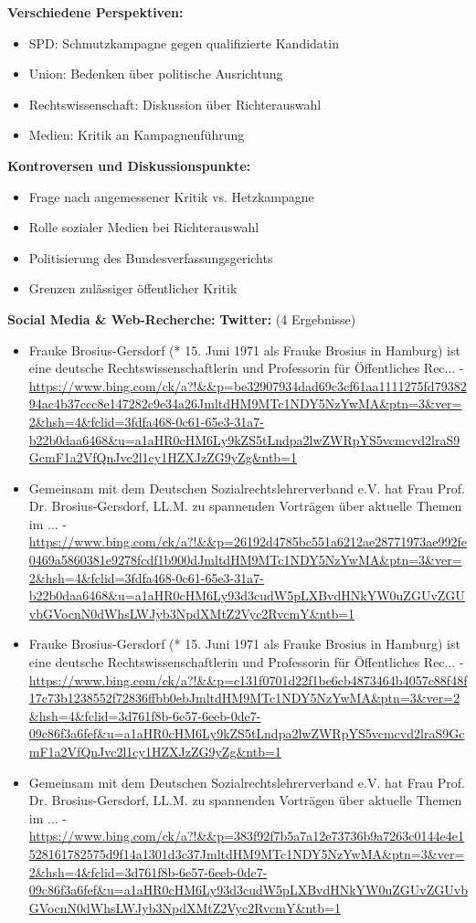 \documentclass[12pt,a4paper]{article}
\begin{document}
\textbf{Verschiedene Perspektiven:}
\begin{itemize}
\item SPD: Schmutzkampagne gegen qualifizierte Kandidatin
\item Union: Bedenken über politische Ausrichtung
\item Rechtswissenschaft: Diskussion über Richterauswahl
\item Medien: Kritik an Kampagnenführung
\end{itemize}

\textbf{Kontroversen und Diskussionspunkte:}
\begin{itemize}
\item Frage nach angemessener Kritik vs. Hetzkampagne
\item Rolle sozialer Medien bei Richterauswahl
\item Politisierung des Bundesverfassungsgerichts
\item Grenzen zulässiger öffentlicher Kritik
\end{itemize}

\textbf{Social Media \& Web-Recherche:}
\textbf{Twitter:} (4 Ergebnisse)
\begin{itemize}
\item Frauke Brosius-Gersdorf (* 15. Juni 1971 als Frauke Brosius in Hamburg) ist eine deutsche Rechtswissenschaftlerin und Professorin für Öffentliches Rec... - \url{https://www.bing.com/ck/a?!&&p=be32907934dad69c3cf61aa1111275fd7938294ac4b37ccc8e147282c9e34a26JmltdHM9MTc1NDY5NzYwMA&ptn=3&ver=2&hsh=4&fclid=3fdfa468-0c61-65e3-31a7-b22b0daa6468&u=a1aHR0cHM6Ly9kZS5tLndpa2lwZWRpYS5vcmcvd2lraS9GcmF1a2VfQnJvc2l1cy1HZXJzZG9yZg&ntb=1}
\item Gemeinsam mit dem Deutschen Sozialrechtslehrerverband e.V. hat Frau Prof. Dr. Brosius-Gersdorf, LL.M. zu spannenden Vorträgen über aktuelle Themen im ... - \url{https://www.bing.com/ck/a?!&&p=26192d4785bc551a6212ae28771973ae992fe0469a5860381e9278fcdf1b900dJmltdHM9MTc1NDY5NzYwMA&ptn=3&ver=2&hsh=4&fclid=3fdfa468-0c61-65e3-31a7-b22b0daa6468&u=a1aHR0cHM6Ly93d3cudW5pLXBvdHNkYW0uZGUvZGUvbGVocnN0dWhsLWJyb3NpdXMtZ2Vyc2RvcmY&ntb=1}
\item Frauke Brosius-Gersdorf (* 15. Juni 1971 als Frauke Brosius in Hamburg) ist eine deutsche Rechtswissenschaftlerin und Professorin für Öffentliches Rec... - \url{https://www.bing.com/ck/a?!&&p=c131f0701d22f1be6cb4873464b4057c88f48f17c73b1238552f72836ffbb0ebJmltdHM9MTc1NDY5NzYwMA&ptn=3&ver=2&hsh=4&fclid=3d761f8b-6e57-6eeb-0de7-09c86f3a6fef&u=a1aHR0cHM6Ly9kZS5tLndpa2lwZWRpYS5vcmcvd2lraS9GcmF1a2VfQnJvc2l1cy1HZXJzZG9yZg&ntb=1}
\item Gemeinsam mit dem Deutschen Sozialrechtslehrerverband e.V. hat Frau Prof. Dr. Brosius-Gersdorf, LL.M. zu spannenden Vorträgen über aktuelle Themen im ... - \url{https://www.bing.com/ck/a?!&&p=383f92f7b5a7a12e73736b9a7263c0144e4e1528161782575d9f14a1301d3c37JmltdHM9MTc1NDY5NzYwMA&ptn=3&ver=2&hsh=4&fclid=3d761f8b-6e57-6eeb-0de7-09c86f3a6fef&u=a1aHR0cHM6Ly93d3cudW5pLXBvdHNkYW0uZGUvZGUvbGVocnN0dWhsLWJyb3NpdXMtZ2Vyc2RvcmY&ntb=1}
\end{itemize}
\end{document}
